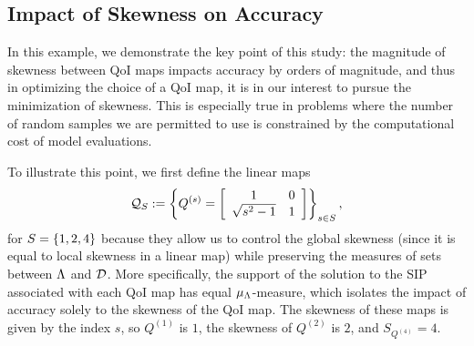 \subsection{Impact of Skewness on Accuracy}\label{ex:skewness}
In this example, we demonstrate the key point of this study: the magnitude of skewness between QoI maps impacts accuracy by orders of magnitude, and thus in optimizing the choice of a QoI map, it is in our interest to pursue the minimization of skewness.
This is especially true in problems where the number of random samples we are permitted to use is constrained by the computational cost of model evaluations.


To illustrate this point, we first define the linear maps
\begin{equation}\label{eq:qmap2}
\qspace_S := \left \lbrace Q^{(s)} =  \mat{cc}{1 & 0 \\ \sqrt{s^2 - 1}& 1 } \right \rbrace_{s\in S},
\end{equation}
for $S=\set{1,2,4}$ because they allow us to control the global skewness (since it is equal to local skewness in a linear map) while preserving the measures of sets between $\pspace$ and $\dspace$.
More specifically, the support of the solution to the SIP associated with each QoI map has equal $\mu_\pspace$-measure, which isolates the impact of accuracy solely to the skewness of the QoI map.
The skewness of these maps is given by the index $s$, so $Q^{(1)}$ is $1$, the skewness of $Q^{(2)}$ is $2$, and $S_{Q^{(4)}} = 4$.


